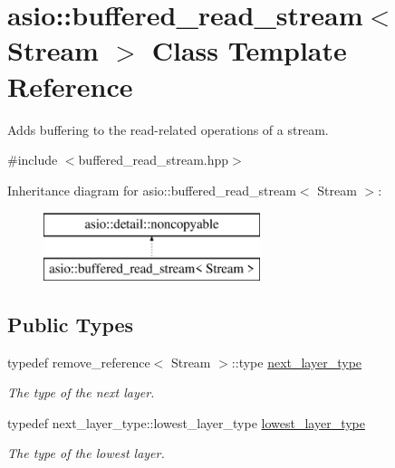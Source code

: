 \hypertarget{classasio_1_1buffered__read__stream}{}\section{asio\+:\+:buffered\+\_\+read\+\_\+stream$<$ Stream $>$ Class Template Reference}
\label{classasio_1_1buffered__read__stream}


Adds buffering to the read-\/related operations of a stream.  




{\ttfamily \#include $<$buffered\+\_\+read\+\_\+stream.\+hpp$>$}

Inheritance diagram for asio\+:\+:buffered\+\_\+read\+\_\+stream$<$ Stream $>$\+:\begin{figure}[H]
\begin{center}
\leavevmode
\includegraphics[height=2.000000cm]{classasio_1_1buffered__read__stream}
\end{center}
\end{figure}
\subsection*{Public Types}
\begin{DoxyCompactItemize}
\item 
typedef remove\+\_\+reference$<$ Stream $>$\+::type \hyperlink{classasio_1_1buffered__read__stream_a9f1f181db6c3207bd4c1c8fe6642d531}{next\+\_\+layer\+\_\+type}
\begin{DoxyCompactList}\small\item\em The type of the next layer. \end{DoxyCompactList}\item 
typedef next\+\_\+layer\+\_\+type\+::lowest\+\_\+layer\+\_\+type \hyperlink{classasio_1_1buffered__read__stream_a041a7cecfeb013857bd1839dcd43de49}{lowest\+\_\+layer\+\_\+type}
\begin{DoxyCompactList}\small\item\em The type of the lowest layer. \end{DoxyCompactList}\end{DoxyCompactItemize}
